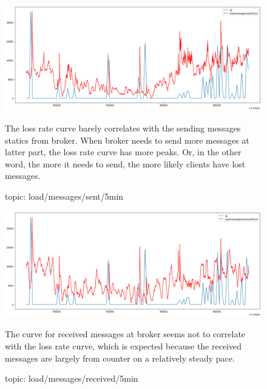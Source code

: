 \documentclass[12pt, letterpaper]{article}
\begin{document}
\begin{figure}
	\caption{topic: load/messages/sent/5min}
	\label{f:loss_cnt_load_messages_sent_5min}
	\begin{center}
		\includegraphics[width=\textwidth]{loss_cnt/loss-load_messages_sent_5min}
	\end{center}
	The loss rate curve barely correlates with the sending messages statics from broker. When broker needs to send more messages at latter part, the loss rate curve has more peaks. Or, in the other word, the more it needs to send, the more likely clients have lost messages.
\end{figure}

\begin{figure}
	\caption{topic: load/messages/received/5min}
	\label{f:loss_cnt_load_messages_received_5min}
	\begin{center}
		\includegraphics[width=\textwidth]{loss_cnt/loss-load_messages_received_5min}   
	\end{center}
	The curve for received messages at broker seems not to correlate with the loss rate curve, which is expected because the received messages are largely from counter on a relatively steady pace.
\end{figure}
\end{document}
